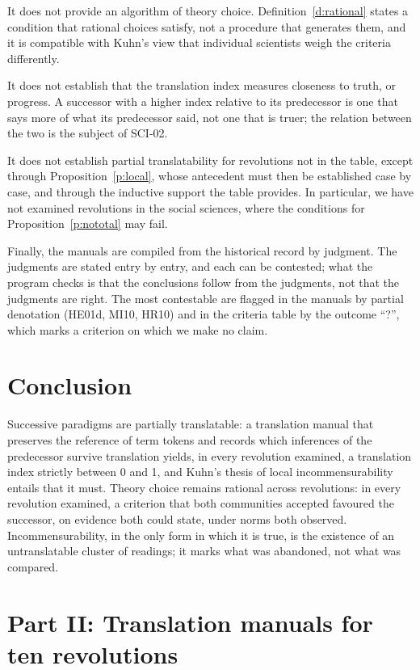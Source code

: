 \documentclass{situationist-preprint}
\begin{document}
It does not provide an algorithm of theory choice. Definition~\ref{d:rational} states a condition that rational choices satisfy, not a procedure that generates them, and it is compatible with Kuhn's view that individual scientists weigh the criteria differently.

It does not establish that the translation index measures closeness to truth, or progress. A successor with a higher index relative to its predecessor is one that says more of what its predecessor said, not one that is truer; the relation between the two is the subject of SCI-02.

It does not establish partial translatability for revolutions not in the table, except through Proposition~\ref{p:local}, whose antecedent must then be established case by case, and through the inductive support the table provides. In particular, we have not examined revolutions in the social sciences, where the conditions for Proposition~\ref{p:nototal} may fail.

Finally, the manuals are compiled from the historical record by judgment. The judgments are stated entry by entry, and each can be contested; what the program checks is that the conclusions follow from the judgments, not that the judgments are right. The most contestable are flagged in the manuals by partial denotation (HE01d, MI10, HR10) and in the criteria table by the outcome \enquote{?}, which marks a criterion on which we make no claim.

\section{Conclusion}\label{s:conclusion}

Successive paradigms are partially translatable: a translation manual that preserves the reference of term tokens and records which inferences of the predecessor survive translation yields, in every revolution examined, a translation index strictly between 0 and 1, and Kuhn's thesis of local incommensurability entails that it must. Theory choice remains rational across revolutions: in every revolution examined, a criterion that both communities accepted favoured the successor, on evidence both could state, under norms both observed. Incommensurability, in the only form in which it is true, is the existence of an untranslatable cluster of readings; it marks what was abandoned, not what was compared.

\clearpage
\appendix
\section*{Part II: Translation manuals for ten revolutions}\label{s:appendix}
\end{document}
